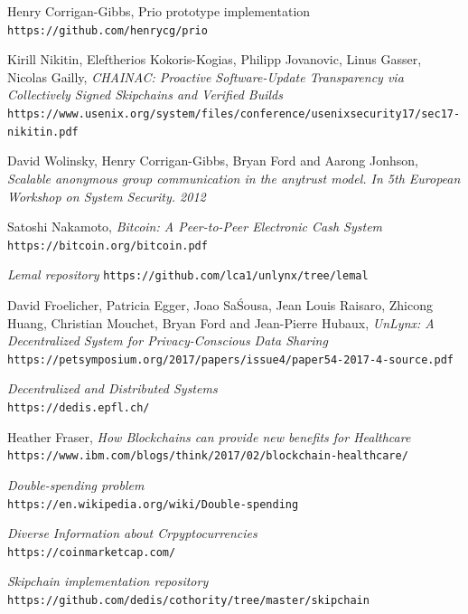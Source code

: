 \documentclass{article}
\begin{document}
\newpage
\begin{thebibliography}{9}
Henry Corrigan-Gibbs, Prio prototype implementation\\
\texttt{https://github.com/henrycg/prio}

Kirill Nikitin, Eleftherios Kokoris-Kogias, Philipp Jovanovic, Linus Gasser, Nicolas Gailly, \textit{CHAINAC: Proactive Software-Update Transparency via Collectively Signed Skipchains and Verified Builds}\\
\texttt{https://www.usenix.org/system/files/conference/usenixsecurity17/sec17-nikitin.pdf}

David Wolinsky, Henry Corrigan-Gibbs, Bryan Ford and Aarong Jonhson, \textit{Scalable anonymous group communication in the anytrust model. In 5th European Workshop on System Security. 2012}

Satoshi Nakamoto, \textit{Bitcoin: A Peer-to-Peer Electronic Cash System}\\
\texttt{https://bitcoin.org/bitcoin.pdf}

\textit{Lemal repository}
\texttt{https://github.com/lca1/unlynx/tree/lemal}

David Froelicher, Patricia Egger, Joao Sa\' Sousa, Jean Louis Raisaro, Zhicong Huang, Christian Mouchet, Bryan Ford and Jean-Pierre Hubaux, \textit{UnLynx: A Decentralized System for Privacy-Conscious Data Sharing}\\
\texttt{https://petsymposium.org/2017/papers/issue4/paper54-2017-4-source.pdf}

\textit{Decentralized and Distributed Systems}\\
\texttt{https://dedis.epfl.ch/}

Heather Fraser, \textit{How Blockchains can provide new benefits for Healthcare}\\
\texttt{https://www.ibm.com/blogs/think/2017/02/blockchain-healthcare/}

\textit{Double-spending problem}\\
\texttt{https://en.wikipedia.org/wiki/Double-spending}

\textit{Diverse Information about Crpyptocurrencies}\\
\texttt{https://coinmarketcap.com/}

\textit{Skipchain implementation repository}\\
\texttt{https://github.com/dedis/cothority/tree/master/skipchain}


\end{thebibliography}
\end{document}
